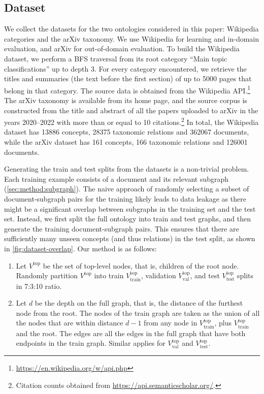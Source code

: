 \documentclass{article}
\begin{document}
\subsection{Dataset}  \label{sec:dataset}



We collect the datasets for the two ontologies considered in this paper: Wikipedia categories and the arXiv taxonomy. We use Wikipedia for learning and in-domain evaluation, and arXiv for out-of-domain evaluation. To build the Wikipedia dataset, we perform a BFS traversal from its root category ``Main topic classifications'' up to depth 3. For every category encountered, we retrieve the titles and summaries (the text before the first section) of up to 5000 pages that belong in that category. The source data is obtained from the Wikipedia API.\footnote{\url{https://en.wikipedia.org/w/api.php}}
The arXiv taxonomy is available from its home page, and the source corpus is constructed from the title and abstract of all the papers uploaded to arXiv in the years 2020--2022 with more than or equal to 10 citations.\footnote{Citation counts obtained from \url{https://api.semanticscholar.org/}.} In total, the Wikipedia dataset has 13886 concepts, 28375 taxonomic relations and 362067 documents, while the arXiv dataset has 161 concepts, 166 taxonomic relations and 126001 documents.


Generating the train and test splits from the datasets is a non-trivial problem. Each training example consists of a document and its relevant subgraph (\cref{sec:method:subgraph}). The naive approach of randomly selecting a subset of document-subgraph pairs for the training likely leads to data leakage as there might be a significant overlap between subgraphs in the training set and the test set. Instead, we first split the full ontology into train and test graphs, and then generate the training document-subgraph pairs. This ensures that there are sufficiently many unseen concepts (and thus relations) in the test split, as shown in \cref{fig:dataset-overlap}. Our method is as follows:
\begin{enumerate}[itemsep=0pt,leftmargin=*]
    \item Let $V^\text{top}$ be the set of top-level nodes, that is, children of the root node. Randomly partition $V^\text{top}$ into train $V^\text{top}_{\text{train}}$, validation $V^\text{top}_{\text{val}}$, and test $V^\text{top}_{\text{test}}$ splits in 7:3:10 ratio.
    \item Let $d$ be the depth on the full graph, that is, the distance of the furthest node from the root. The nodes of the train graph are taken as the union of all the nodes that are within distance $d - 1$ from any node in $V^\text{top}_\text{train}$, plus $V_\text{train}^\text{top}$ and the root. The edges are all the edges in the full graph that have both endpoints in the train graph. Similar applies for $V^\text{top}_\text{val}$ and $V^\text{top}_\text{test}$.
\end{enumerate}
\end{document}

